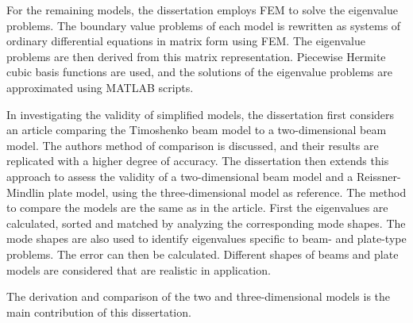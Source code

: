 \documentclass[main.tex]{subfiles}
\begin{document}
For the remaining models, the dissertation employs FEM to solve the eigenvalue problems. The boundary value problems of each model is rewritten as systems of ordinary differential equations in matrix form using FEM. The eigenvalue problems are then derived from this matrix representation. Piecewise Hermite cubic basis functions are used, and the solutions of the eigenvalue problems are approximated using MATLAB scripts.

In investigating the validity of simplified models, the dissertation first considers an article comparing the Timoshenko beam model to a two-dimensional beam model. The authors method of comparison is discussed, and their results are replicated with a higher degree of accuracy. The dissertation then extends this approach to assess the validity of a two-dimensional beam model and a Reissner-Mindlin plate model, using the three-dimensional model as reference. The method to compare the models are the same as in the article. First the eigenvalues are calculated, sorted and matched by analyzing the corresponding mode shapes. The mode shapes are also used to identify eigenvalues specific to beam- and plate-type problems. The error can then be calculated. Different shapes of beams and plate models are considered that are realistic in application. 

The derivation and comparison of the two and three-dimensional models is the main contribution of this dissertation.
\end{document}
